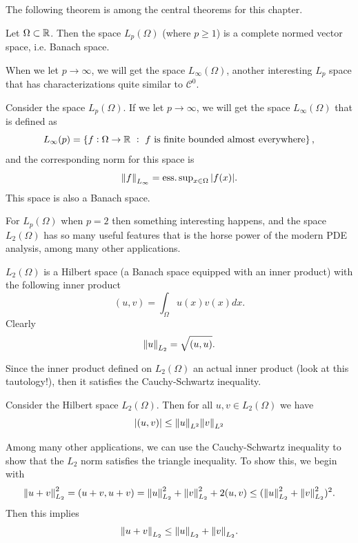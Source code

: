 The following theorem is among the central theorems for this chapter. 

\begin{theorem}
	Let $ \Omega\subset \mathbb{R}$. Then the space $ L_p(\Omega) $ (where $ p \geq 1 $) is a complete normed vector space, i.e. Banach space. 
\end{theorem}

When we let $ p\to \infty $, we will get the space $ L_\infty(\Omega) $, another interesting $ L_p  $ space that has characterizations quite similar to $ \mathscr{C}^0 $. 

\begin{proposition}
	Consider the space $ L_p(\Omega) $. If we let $ p\to \infty $, we will get the space $ L_\infty(\Omega) $ that is defined as
	\[ L_\infty(p) = \left\{ f: \Omega\to \mathbb{R}\ :\ \text{$ f $ is finite bounded almost everywhere} \right\}, \]
	and the corresponding norm for this space is
	\[ \norm{f}_{L_\infty} = \operatorname{ess.sup}_{x\in \Omega} |f(x)|. \]
	This space is also a Banach space. 
\end{proposition}


For $ L_p(\Omega) $ when $ p=2 $ then something interesting happens, and the space $ L_2(\Omega) $ has so many useful features that is the horse power of the modern PDE analysis, among many other applications. 

\begin{proposition}
	$ L_2(\Omega) $ is a Hilbert space (a Banach space equipped with an inner product) with the following inner product
	\[ (u,v) = \int_\Omega {u(x)v(x)} dx. \]
	Clearly
	\[ \norm{u}_{L_2} = \sqrt{(u,u)}. \]
\end{proposition}
Since the inner product defined on $ L_2(\Omega) $ an actual inner product (look at this tautology!), then it satisfies the Cauchy-Schwartz inequality.

\begin{proposition}
	Consider the Hilbert space $ L_2(\Omega) $. Then for all $ u,v \in L_2(\Omega) $ we have
	\[ |(u,v)| \leq \norm{u}_{L^2} \norm{v}_{L^2} \]
\end{proposition} 

\begin{remark}
	Among many other applications, we can use the Cauchy-Schwartz inequality to show that the $ L_2 $ norm satisfies the triangle inequality. To show this, we begin with
	\[  \norm{u+v}_{L_2}^2 = (u+v,u+v) = \norm{u}^2_{L_2} + \norm{v}^2_{L_2} + 2(u,v) \leq (\norm{u}^2_{L_2} + \norm{v}^2_{L_2})^2 . \]
	Then this implies
	\[ \norm{u+v}_{L_2} \leq \norm{u}_{L_2} + \norm{v}_{L_2}. \]
\end{remark}

